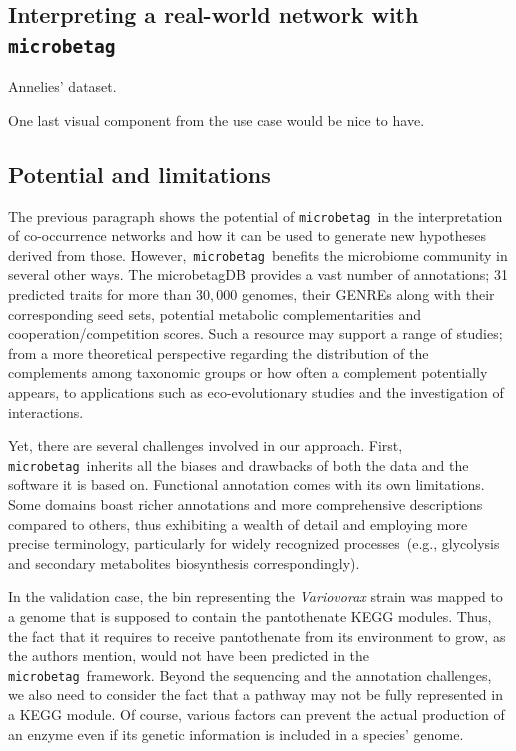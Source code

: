 \documentclass[sn-mathphys,Numbered]{sn-jnl}  %
\theoremstyle{thmstyleone}%
\theoremstyle{thmstyletwo}%
\theoremstyle{thmstylethree}%
\newcommand{\microbetag}{\texttt{microbetag}}
\begin{document}



    \subsection*{Interpreting a real-world network with \microbetag}
        \label{subsec:usecase}


        Annelies' dataset. 

        One last visual component from the use case would be nice to have.  





    \subsection*{Potential and limitations}
    \label{subsec:pot-and-limits}

        The previous paragraph shows the potential of \microbetag~\space in the interpretation of co-occurrence networks and how it can be used to generate new hypotheses derived from those.
        However,~\microbetag~\space benefits the microbiome community in several other ways. 
        The microbetagDB provides a vast number of annotations; 31 predicted traits for more than $30,000$ genomes, their GENREs along with their corresponding seed sets, potential metabolic complementarities and cooperation/competition scores.
        Such a resource may support a range of studies; 
        from a more theoretical perspective regarding the distribution of the complements among taxonomic groups or how often a complement potentially appears, to applications such as eco-evolutionary studies and the investigation of interactions.

        Yet, there are several challenges involved in our approach.
        First, \microbetag~\space inherits all the biases and drawbacks of both the data and the software it is based on.
        Functional annotation comes with its own limitations.
        Some domains boast richer annotations and more comprehensive descriptions compared to others, thus exhibiting a wealth of detail and employing more precise terminology, particularly for widely recognized processes~(e.g., glycolysis and secondary metabolites biosynthesis correspondingly).

        In the validation case, the bin representing the \textit{Variovorax} strain was mapped to a genome that is supposed to contain the pantothenate KEGG modules.
        Thus, the fact that it requires to receive pantothenate from its environment to grow, as the authors mention, would not have been predicted in the \microbetag~\space framework. 
        Beyond the sequencing and the annotation challenges, we also need to consider the fact that a pathway may not be fully represented in a KEGG module.
        Of course, various factors can prevent the actual production of an enzyme even if its genetic information is included in a species' genome.
        
\end{document}
